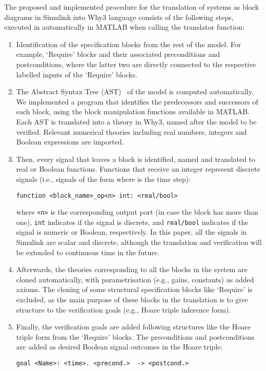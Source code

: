 \documentclass[a4paper]{article}
\begin{document}
The proposed and implemented procedure for the translation of systems as block diagrams in Simulink into Why3 language consists of the following steps, executed in automatically in MATLAB when calling the translator function:
\begin{enumerate}
\item  Identification of the specification blocks from the rest of the model. For example, `Require' blocks and their associated preconditions and postconditions, where the latter two are directly connected to the respective labelled inputs of the `Require' blocks. 

\item The Abstract Syntax Tree (AST)~\cite{PVS,Simcheck} of the model is computed automatically. We implemented a program that identifies the predecessors and successors of each block, using the block manipulation functions available in MATLAB. Each AST is translated into a theory in Why3, named after the model to be verified. Relevant numerical theories including real numbers, integers and Boolean expressions are imported. 

\item Then, every signal that leaves a block is identified, named and translated to real or Boolean functions. Functions that receive an integer represent discrete signals (i.e., signals of the form  where  is the time step): 


\begin{verbatim}
function <block_name>_op<n> int: <real/bool>
\end{verbatim}
where \verb+<n>+ is the corresponding output port (in case the block has more than one), \verb+int+ indicates if the signal is discrete, and \verb+real/bool+ indicates if the signal is numeric or Boolean, respectively. In this paper, all the signals in Simulink are scalar and discrete, although the translation and verification will be extended to continuous time in the future. 

\item Afterwards, the theories corresponding to all the blocks in the system are cloned automatically, with parametrisation (e.g., gains, constants) as added axioms. The cloning of some structural specification blocks like `Require' is excluded, as the main purpose of these blocks in the translation is to give structure to the verification goals (e.g., Hoare triple inference form).  

\item Finally, the verification goals are added following structures like the Hoare triple form from the `Require' blocks. The preconditions and postconditions are added as desired Boolean signal outcomes in the Hoare triple: 

\begin{verbatim}
goal <Name>: <time>. <precond.>  -> <postcond.>
\end{verbatim}
\end{enumerate}
\end{document}
